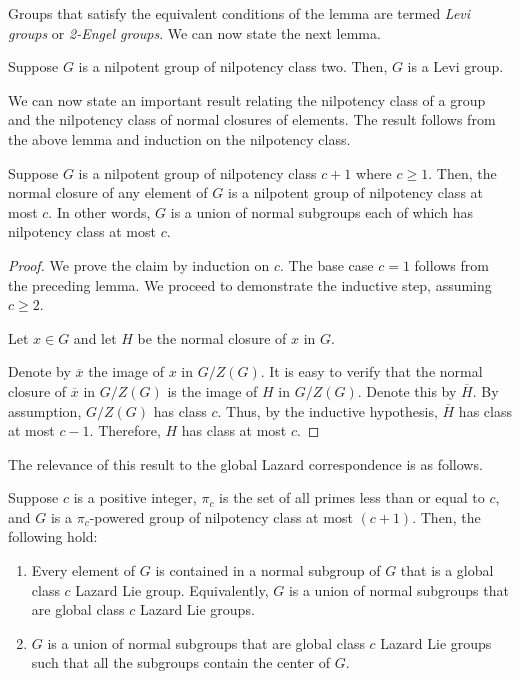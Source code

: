 Groups that satisfy the equivalent conditions of the lemma are termed
{\em Levi groups} or {\em 2-Engel groups}. We can now state the next
lemma.

\begin{lemma}
  Suppose $G$ is a nilpotent group of nilpotency class two. Then, $G$
  is a Levi group.
\end{lemma}

We can now state an important result relating the nilpotency class of
a group and the nilpotency class of normal closures of elements. The
result follows from the above lemma and induction on the nilpotency
class.

\begin{lemma}\label{lemma:union-of-normal}
  Suppose $G$ is a nilpotent group of nilpotency class $c + 1$ where
  $c \ge 1$. Then, the normal closure of any element of $G$ is a
  nilpotent group of nilpotency class at most $c$. In other words, $G$
  is a union of normal subgroups each of which has nilpotency class at
  most $c$.
\end{lemma}

\begin{proof}
  We prove the claim by induction on $c$. The base case $c = 1$
  follows from the preceding lemma. We proceed to demonstrate the
  inductive step, assuming $c \ge 2$.

  Let $x \in G$ and let $H$ be the normal closure of $x$ in
  $G$.

  Denote by $\overline{x}$ the image of $x$ in $G/Z(G)$. It is easy to
  verify that the normal closure of $\overline{x}$ in $G/Z(G)$ is the
  image of $H$ in $G/Z(G)$. Denote this by $\overline{H}$. By
  assumption, $G/Z(G)$ has class $c$. Thus, by the inductive
  hypothesis, $\overline{H}$ has class at most $c - 1$. Therefore, $H$
  has class at most $c$.
\end{proof}

The relevance of this result to the global Lazard correspondence is as
follows.

\begin{lemma}\label{lemma:union-of-lazard}
  Suppose $c$ is a positive integer, $\pi_c$ is the set of all primes
  less than or equal to $c$, and $G$ is a $\pi_c$-powered group of
  nilpotency class at most $(c + 1)$. Then, the following hold:

  \begin{enumerate}
  \item Every element of $G$ is contained in a normal subgroup of $G$
    that is a global class $c$ Lazard Lie group. Equivalently, $G$ is
    a union of normal subgroups that are global class $c$ Lazard Lie
    groups.
  \item $G$ is a union of normal subgroups that are global class $c$
    Lazard Lie groups such that all the subgroups contain the center
    of $G$.
  \end{enumerate}
\end{lemma}

